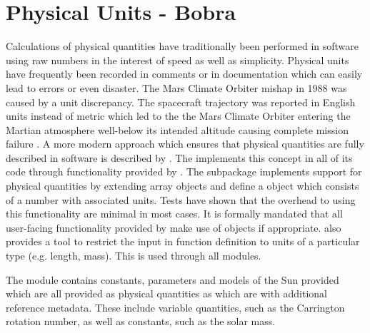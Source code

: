 \section{Physical Units - Bobra}
\label{sec:units}


Calculations of physical quantities have traditionally been performed in software using raw numbers in the interest of speed as well as simplicity. 
Physical units have frequently been recorded in comments or in documentation which can easily lead to errors or even disaster. 
The Mars Climate Orbiter mishap in 1988 was caused by a unit discrepancy. 
The spacecraft trajectory was reported in English units instead of metric which led to the the Mars Climate Orbiter entering the Martian atmosphere well-below its intended altitude causing complete mission failure \citep{mco_mishap_report}. 
A more modern approach which ensures that physical quantities are fully described in 
software is described by \citep{Damevski2009}. 
The \sunpypkg implements this concept in all of its code through functionality provided by \astropy. 
The  subpackage implements support for physical quantities by extending \numpy array objects and define a  object which consists of a number with associated units. 
Tests have shown that the overhead to using this functionality are minimal in most cases. 
It is formally mandated that all user-facing functionality provided by \sunpypkg make use of  objects if appropriate. 
 also provides a tool to restrict the input in function definition to units of a particular type (e.g. length, mass). 
This is used through all \sunpypkg modules.

The  module contains constants, parameters and models of the Sun provided which are all provided as physical quantities as  which are  with additional reference metadata. 
These include variable quantities, such as the Carrington rotation number, as well as constants, such as the solar mass. 



